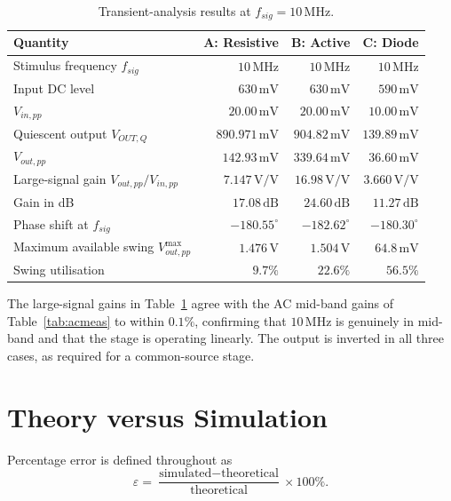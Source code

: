 \documentclass[12pt,a4paper]{article}
\newcommand{\U}[1]{\,\mathrm{#1}}
\newcommand{\dg}{^{\circ}}
\begin{document}
\begin{table}[H]
\centering
\caption{Transient-analysis results at $f_{sig}=10\U{MHz}$.}
\label{tab:tran}
\small
\begin{tabular}{lrrr}
\toprule
\textbf{Quantity} & \textbf{A: Resistive} & \textbf{B: Active} & \textbf{C: Diode} \\
\midrule
Stimulus frequency $f_{sig}$ & $10\U{MHz}$ & $10\U{MHz}$ & $10\U{MHz}$ \\
Input DC level               & $630\U{mV}$ & $630\U{mV}$ & $590\U{mV}$ \\
$V_{in,pp}$                  & $20.00\U{mV}$ & $20.00\U{mV}$ & $10.00\U{mV}$ \\
Quiescent output $V_{OUT,Q}$ & $890.971\U{mV}$ & $904.82\U{mV}$ & $139.89\U{mV}$ \\
$V_{out,pp}$                 & $142.93\U{mV}$ & $339.64\U{mV}$ & $36.60\U{mV}$ \\
Large-signal gain $V_{out,pp}/V_{in,pp}$ & $7.147\U{V/V}$ & $16.98\U{V/V}$ & $3.660\U{V/V}$ \\
Gain in dB                   & $17.08\U{dB}$ & $24.60\U{dB}$ & $11.27\U{dB}$ \\
Phase shift at $f_{sig}$     & $-180.55\dg$ & $-182.62\dg$ & $-180.30\dg$ \\
Maximum available swing $V_{out,pp}^{\max}$ & $1.476\U{V}$ & $1.504\U{V}$ & $64.8\U{mV}$ \\
Swing utilisation            & $9.7\%$ & $22.6\%$ & $56.5\%$ \\
\bottomrule
\end{tabular}
\end{table}

The large-signal gains in Table~\ref{tab:tran} agree with the AC mid-band gains
of Table~\ref{tab:acmeas} to within $0.1\%$, confirming that $10\U{MHz}$ is
genuinely in mid-band and that the stage is operating linearly. The output is
inverted in all three cases, as required for a common-source stage.

\FloatBarrier

\section{Theory versus Simulation}\label{sec:tvs}
Percentage error is defined throughout as
\begin{equation}
\varepsilon = \frac{\text{simulated}-\text{theoretical}}{\text{theoretical}}\times 100\% .
\end{equation}
\end{document}
